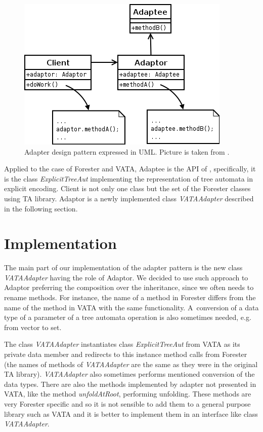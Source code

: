 \begin{figure}
	\begin{center}
		\includegraphics[scale=0.4]{fig/adapter.png}
	\end{center}
	\caption{Adapter design pattern expressed in UML.
	Picture is taken from \cite{wiki:adapter}.}
	\label{fig:adapter}
\end{figure}

Applied to the case of Forester and VATA,
Adaptee is the API of \vata, specifically, it is the class \emph{ExplicitTreeAut}
implementing the representation of tree automata in explicit encoding.
Client is not only one class but the set of the Forester classes using TA library.
Adaptor is a newly implemented class \emph{VATAAdapter} described in the following section.

\section{Implementation}
\label{sec:fova_impl}

The main part of our implementation of the adapter pattern is
the new class \emph{VATAAdapter} having the role of Adaptor.
We decided to use such approach to Adaptor preferring the composition over the inheritance,
since we often needs to rename methods.
For instance, the name of a method in Forester differs from
the name of the method in VATA with the same functionality.
A~conversion of a data type of a parameter of a tree automata operation
is also sometimes needed, e.g. from vector to set. 

The class \emph{VATAAdapter} instantiates class \emph{ExplicitTreeAut} from VATA as its private data member
and redirects to this instance method calls from Forester (the names of methods of \emph{VATAAdapter} are the same as they were
in the original TA library).
\emph{VATAAdapter} also sometimes performs mentioned conversion of the data types.
There are also the methods implemented by adapter not presented
in VATA, like the method \emph{unfoldAtRoot}, performing unfolding.
These methods are very Forester specific
and so it is not sensible to add them to a general purpose library such as VATA
and it is better to implement them in an interface like class \emph{VATAAdapter}.

